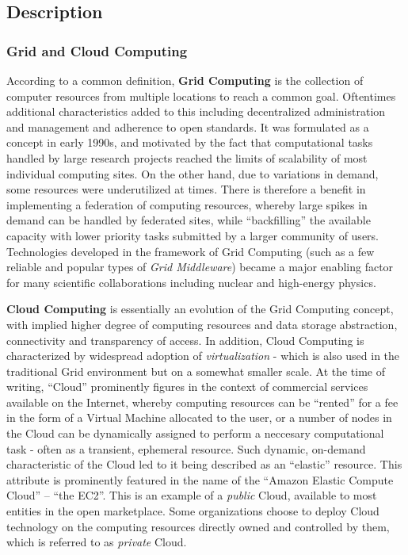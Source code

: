 \subsection{Description}

\subsubsection{Grid and Cloud Computing}
\label{cloud}
According to a common definition, \textbf{Grid Computing} is the collection of computer resources from multiple locations to reach a common goal. Oftentimes additional
characteristics added to this including decentralized administration and management and adherence to open standards. It was formulated as a concept in early 1990s,
and motivated by the fact that computational tasks handled by large research projects reached the limits of scalability of most individual computing sites.
On the other hand, due to variations in demand, some resources were underutilized at times. There is therefore a benefit in implementing a federation of computing
resources, whereby large spikes in demand can be handled by federated sites, while ``backfilling'' the available capacity with lower priority tasks submitted by a
larger community of users. Technologies developed in the framework of Grid Computing (such as a few reliable and popular types of \textit{Grid Middleware})
became a major enabling factor for many scientific collaborations including nuclear and high-energy physics.

\textbf{Cloud Computing} is essentially an evolution of the Grid Computing concept, with implied higher degree of computing resources and data
storage abstraction, connectivity and transparency of access. In addition, Cloud Computing is characterized by widespread adoption of \textit{virtualization} - which is
also used in the traditional Grid environment but on a somewhat smaller scale. At the time of writing, ``Cloud'' prominently figures in the context of commercial services available on
the Internet, whereby computing resources can be ``rented'' for a fee in the form of a Virtual Machine allocated to the user, or a  number of nodes in the Cloud can
be dynamically assigned to perform a neccesary computational task - often as a transient, ephemeral resource. Such dynamic, on-demand characteristic of the
Cloud led to it being described as an ``elastic'' resource. This attribute is prominently featured in the name of the ``Amazon Elastic Compute Cloud'' -- ``the EC2''.
This is an example of a \textit{public} Cloud, available to most entities in the open marketplace. Some organizations choose to deploy Cloud technology on the
computing resources directly owned and controlled by them, which is referred to as \textit{private} Cloud.

